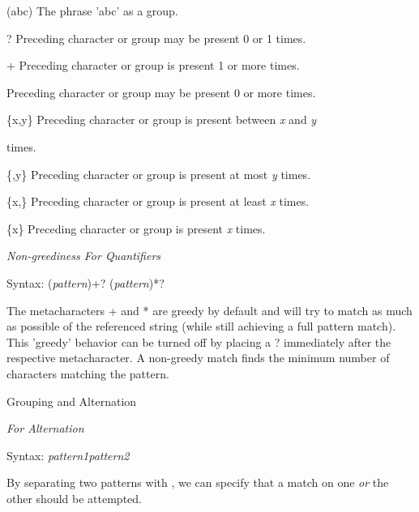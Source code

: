 \documentclass[a4paper,11pt]{book}
\begin{document}
\noindent 

\noindent (abc) The phrase 'abc' as a group.

\noindent 

\noindent ? Preceding character or group may be present 0 or 1 times.

\noindent 

\noindent + Preceding character or group is present 1 or more times.

\noindent 

\noindent * Preceding character or group may be present 0 or more times.

\noindent \{x,y\} Preceding character or group is present between \textit{x }and \textit{y}

\noindent times.

\noindent 

\noindent \{,y\} Preceding character or group is present at most \textit{y }times.

\noindent 

\noindent \{x,\} Preceding character or group is present at least \textit{x }times.

\noindent 

\noindent \{x\} Preceding character or group is present \textit{x }times.

\noindent 

\noindent 

\noindent \textit{Non-greediness For Quantifiers}

\noindent Syntax: (\textit{pattern})+? (\textit{pattern})*?

\noindent 

\noindent The metacharacters + and * are greedy by default and will try to match as much as possible of the referenced string (while still achieving a full pattern match). This 'greedy' behavior can be turned off by placing a ? immediately after the respective metacharacter. A non-greedy match finds the minimum number of characters matching the pattern.

\noindent 

\noindent Grouping and Alternation

\noindent 

\noindent \textit{\textbar  For Alternation}

\noindent Syntax: \textit{pattern1}\textbar \textit{pattern2}

\noindent 

\noindent By separating two patterns with \textbar , we can specify that a match on one \textit{or }the other should be attempted.
\end{document}
